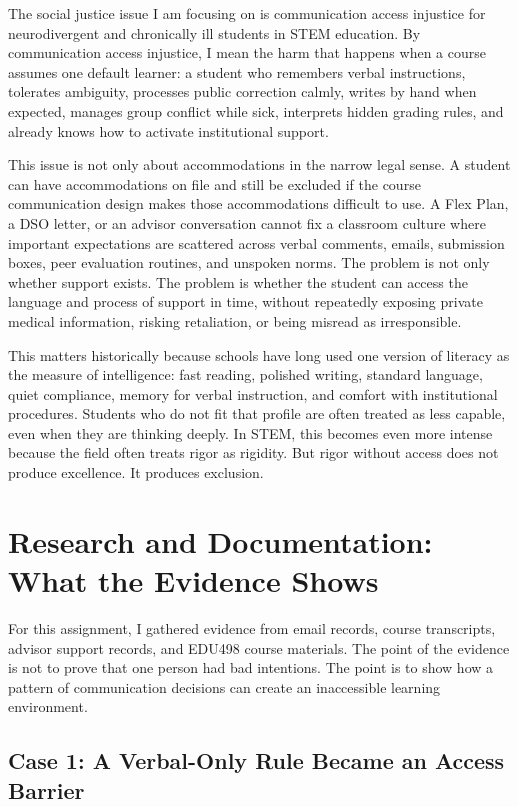 \documentclass[12pt]{article}
\begin{document}
The social justice issue I am focusing on is communication access injustice for neurodivergent and chronically ill students in STEM education. By communication access injustice, I mean the harm that happens when a course assumes one default learner: a student who remembers verbal instructions, tolerates ambiguity, processes public correction calmly, writes by hand when expected, manages group conflict while sick, interprets hidden grading rules, and already knows how to activate institutional support.

This issue is not only about accommodations in the narrow legal sense. A student can have accommodations on file and still be excluded if the course communication design makes those accommodations difficult to use. A Flex Plan, a DSO letter, or an advisor conversation cannot fix a classroom culture where important expectations are scattered across verbal comments, emails, submission boxes, peer evaluation routines, and unspoken norms. The problem is not only whether support exists. The problem is whether the student can access the language and process of support in time, without repeatedly exposing private medical information, risking retaliation, or being misread as irresponsible.

This matters historically because schools have long used one version of literacy as the measure of intelligence: fast reading, polished writing, standard language, quiet compliance, memory for verbal instruction, and comfort with institutional procedures. Students who do not fit that profile are often treated as less capable, even when they are thinking deeply. In STEM, this becomes even more intense because the field often treats rigor as rigidity. But rigor without access does not produce excellence. It produces exclusion.

\section*{Research and Documentation: What the Evidence Shows}

For this assignment, I gathered evidence from email records, course transcripts, advisor support records, and EDU498 course materials. The point of the evidence is not to prove that one person had bad intentions. The point is to show how a pattern of communication decisions can create an inaccessible learning environment.

\subsection*{Case 1: A Verbal-Only Rule Became an Access Barrier}
\end{document}
